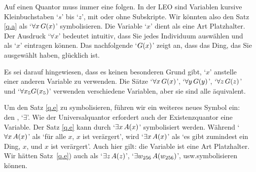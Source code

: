 
Auf einen Quantor muss immer eine  folgen. In der LEO sind Variablen kursive Kleinbuchstaben `$s$' bis `$z$', mit oder ohne Subskripte. Wir könnten also den Satz \ref{q.a} als `$\forall x\, \mathord{G}(x)$' symbolisieren. Die Variable `$x$' dient als eine Art Platzhalter. Der Ausdruck `$\forall x$' bedeutet intuitiv, dass Sie jedes Individuum auswählen und als `$x$' eintragen können. Das nachfolgende `$\mathord{G}(x)$' zeigt an, dass das Ding, das Sie ausgewählt haben, glücklich ist. 


Es sei darauf hingewiesen, dass es keinen besonderen Grund gibt, `$x$' anstelle einer anderen Variable zu verwenden. Die Sätze `$\forall x\, \mathord{G}(x)$', `$\forall y\, \mathord{G}(y)$', `$\forall z\, \mathord{G}(z)$' und `$\forall x_5 \mathord{G}(x_5)$' verwenden verschiedene Variablen, aber sie sind alle äquivalent.

Um den Satz \ref{q.e} zu symbolisieren, führen wir ein weiteres neues Symbol ein: den , `$\exists$'. Wie der Universalquantor erfordert auch der Existenzquantor eine Variable. Der Satz \ref{q.e} kann durch `$\exists x\,\mathord{A}(x)$' symbolisiert werden. Während `$\forall x\,\mathord{A}(x)$' als `für alle $x$, $x$ ist verärgert', wird `$\exists x\,\mathord{A}(x)$' als `es gibt zumindest ein Ding, $x$, und $x$ ist verärgert'. Auch hier gilt: die Variable ist eine Art Platzhalter. Wir hätten Satz~\ref{q.e}) auch als `$\exists z\, \mathord{A}(z)$', `$\exists w_{256}\, \mathord{A}(w_{256})$', usw.\@ symbolisieren können.


